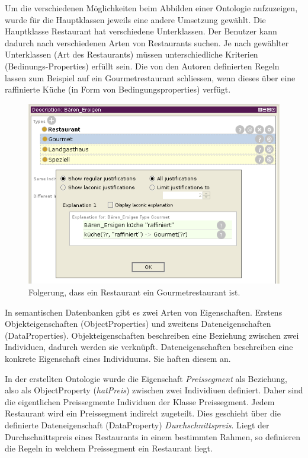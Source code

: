 Um die verschiedenen Möglichkeiten beim Abbilden einer Ontologie aufzuzeigen, wurde für die Hauptklassen jeweils eine andere Umsetzung gewählt. Die Hauptklasse Restaurant hat verschiedene Unterklassen. Der Benutzer kann dadurch nach verschiedenen Arten von Restaurants suchen. Je nach gewählter Unterklassen (Art des Restaurants) müssen unterschiedliche Kriterien (Bedinungs-Properties) erfüllt sein. Die von den Autoren definierten Regeln lassen zum Beispiel auf ein Gourmetrestaurant schliessen, wenn dieses über eine raffinierte Küche (in Form von Bedingungsproperties) verfügt.

\begin{figure}[H]%
    \centering
    \includegraphics[scale=0.7]{bilder/loesung_regeln.png}
    \caption{Folgerung, dass ein Restaurant ein Gourmetrestaurant ist.\label{fig:loesung:regeln}\protect\footnotemark}
\end{figure}

In semantischen Datenbanken gibt es zwei Arten von Eigenschaften. Erstens Objekteigenschaften (ObjectProperties) und zweitens Dateneigenschaften (DataProperties). Objekteigenschaften beschreiben eine Beziehung zwischen zwei Individuen, dadurch werden sie verknüpft. Dateneigenschaften beschreiben eine konkrete Eigenschaft eines Individuums. Sie haften diesem an.

In der erstellten Ontologie wurde die Eigenschaft \textit{Preissegment} als Beziehung, also als ObjectProperty (\textit{hatPreis}) zwischen zwei Individiuen definiert. Daher sind die eigentlichen Preissegmente Individuen der Klasse Preissegment. Jedem Restaurant wird ein Preissegment indirekt zugeteilt. Dies geschieht über die definierte Dateneigenschaft (DataProperty) \textit{Durchschnittspreis}. Liegt der Durchschnittspreis eines Restaurants in einem bestimmten Rahmen, so definieren die Regeln in welchem Preissegment ein Restaurant liegt.


